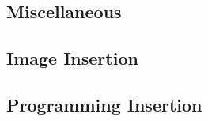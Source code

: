 \documentclass[a4paper, 12pt]{report}
\begin{document}
\begin{center}
\section{Miscellaneous}
\begin{comment}
\end{comment}

\subsection{Image Insertion}
\begin{comment}
\end{comment}

\subsection{Programming Insertion}
\begin{comment}
\end{comment}


\end{center}
\end{document}
